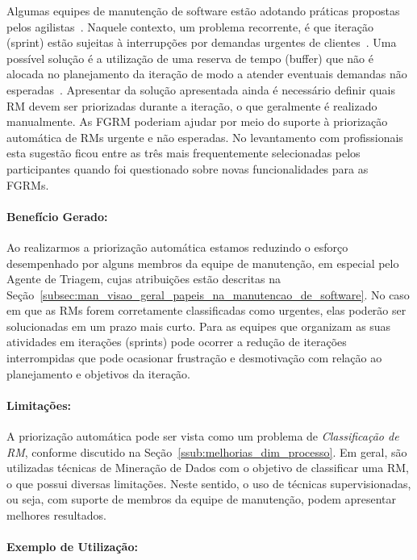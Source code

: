 Algumas equipes de manutenção de software estão adotando práticas propostas
pelos agilistas~\cite{svensson2005introducing}. Naquele contexto, um problema
recorrente, é que iteração (sprint) estão sujeitas à interrupções por demandas
urgentes de clientes~\cite{bennett2000software}. Uma possível solução é a
utilização de uma reserva de tempo (buffer) que não é alocada no planejamento da
iteração de modo a atender eventuais demandas não
esperadas~\cite{schwaber2002agile}. Apresentar da solução apresentada ainda é
necessário definir quais RM devem ser priorizadas durante a iteração, o que
geralmente é realizado manualmente. As FGRM poderiam ajudar por meio do suporte
à priorização automática de RMs urgente e não esperadas. No levantamento com
profissionais esta sugestão ficou entre as três mais frequentemente selecionadas
pelos participantes quando foi questionado sobre novas funcionalidades para as
FGRMs.

\paragraph{Benefício Gerado:}
\label{par:papéis_afetados_s07}

Ao realizarmos a priorização automática estamos reduzindo o esforço desempenhado
por alguns membros da equipe de manutenção, em especial pelo Agente de Triagem,
cujas atribuições estão descritas na
Seção~\ref{subsec:man_visao_geral_papeis_na_manutencao_de_software}. No caso em
que as RMs forem corretamente classificadas como urgentes, elas poderão ser
solucionadas em um prazo mais curto. Para as equipes que organizam as suas
atividades em iterações (sprints) pode ocorrer a redução de iterações
interrompidas que pode ocasionar frustração e desmotivação com relação ao
planejamento e objetivos da iteração.

\paragraph{Limitações:}
\label{par:limitacoes_s07}

A priorização automática pode ser vista como um problema de
\textit{Classificação de RM}, conforme discutido na
Seção~\ref{ssub:melhorias_dim_processo}. Em geral, são utilizadas técnicas de
Mineração de Dados com o objetivo de classificar uma RM, o que possui diversas
limitações. Neste sentido, o uso de técnicas supervisionadas, ou seja, com
suporte de membros da equipe de manutenção, podem apresentar melhores
resultados.

\paragraph{Exemplo de Utilização:}
\label{par:exemplo_de_utilização_s07}


